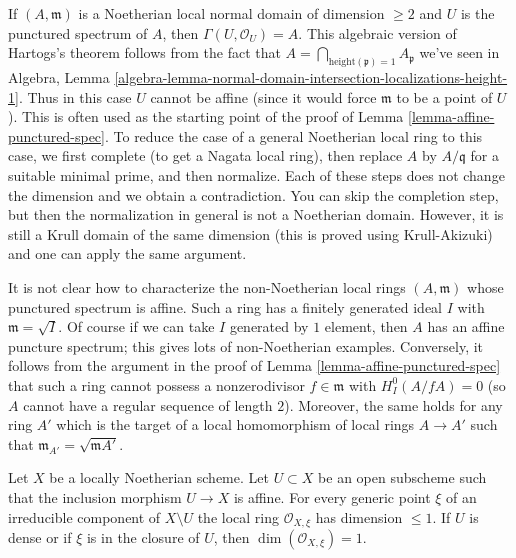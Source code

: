 \begin{remark}
\label{remark-affine-punctured-spectrum-standard-proof}
If $(A, \mathfrak m)$ is a Noetherian local normal domain of
dimension $\geq 2$ and $U$
is the punctured spectrum of $A$, then $\Gamma(U, \mathcal{O}_U) = A$.
This algebraic version of Hartogs's theorem follows from the fact that
$A = \bigcap_{\text{height}(\mathfrak p) = 1} A_\mathfrak p$
we've seen in Algebra, Lemma
\ref{algebra-lemma-normal-domain-intersection-localizations-height-1}.
Thus in this case $U$ cannot be affine (since it would force $\mathfrak m$
to be a point of $U$). This is often used as the starting point of
the proof of Lemma \ref{lemma-affine-punctured-spec}.
To reduce the case of a general Noetherian local ring to this case,
we first complete (to get a Nagata local ring),
then replace $A$ by $A/\mathfrak q$ for a suitable minimal prime,
and then normalize. Each of these steps does not change the
dimension and we obtain a contradiction.
You can skip the completion step, but then the normalization in
general is not a Noetherian domain. However, it is still a
Krull domain of the same dimension (this is proved using
Krull-Akizuki) and one can apply the same argument.
\end{remark}

\begin{remark}
\label{remark-affine-puctured-spectrum-general}
It is not clear how to characterize the non-Noetherian local
rings $(A, \mathfrak m)$ whose punctured spectrum is affine.
Such a ring has a finitely generated ideal $I$ with
$\mathfrak m = \sqrt{I}$. Of course if we can take $I$
generated by $1$ element, then $A$ has an affine puncture
spectrum; this gives lots of non-Noetherian examples.
Conversely, it follows from the argument in the proof of
Lemma \ref{lemma-affine-punctured-spec}
that such a ring cannot possess a nonzerodivisor $f \in \mathfrak m$
with $H^0_I(A/fA) = 0$ (so $A$ cannot have a regular sequence
of length $2$). Moreover, the same holds for any ring $A'$ which is
the target of a local homomorphism of local rings $A \to A'$ such that
$\mathfrak m_{A'} = \sqrt{\mathfrak mA'}$.
\end{remark}

\begin{lemma}
\label{lemma-complement-affine-open-immersion}
\begin{reference}
\cite[EGA IV, Corollaire 21.12.7]{EGA4}
\end{reference}
Let $X$ be a locally Noetherian scheme. Let $U \subset X$ be an open subscheme
such that the inclusion morphism $U \to X$ is affine.
For every generic point $\xi$ of an irreducible component of
$X \setminus U$ the local ring $\mathcal{O}_{X, \xi}$
has dimension $\leq 1$. If $U$ is dense or if $\xi$ is in the closure
of $U$, then $\dim(\mathcal{O}_{X, \xi}) = 1$.
\end{lemma}

